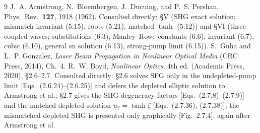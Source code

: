 \documentclass[aps,pra,preprint,amsmath,amssymb,nofootinbib,superscriptaddress]{revtex4-2}
\begin{document}
\begin{thebibliography}{9}
 J.~A. Armstrong, N.~Bloembergen, J.~Ducuing, and
P.~S. Pershan, Phys.\ Rev.\ \textbf{127}, 1918 (1962). Consulted directly:
\S V (SHG exact solution; mismatch invariant (5.15), roots (5.21), matched
$\tanh$ (5.12)) and \S VI (three coupled waves; substitutions (6.3),
Manley--Rowe constants (6.6), invariant (6.7), cubic (6.10), general sn
solution (6.13), strong-pump limit (6.15)).
 S.~Guha and L.~P. Gonzalez, \emph{Laser Beam Propagation
in Nonlinear Optical Media} (CRC Press, 2014), Ch.~4.
 R.~W. Boyd, \emph{Nonlinear Optics}, 4th ed. (Academic
Press, 2020), \S2.6--2.7. Consulted directly: \S2.6 solves SFG only in the
undepleted-pump limit [Eqs.~(2.6.24)--(2.6.25)] and defers the depleted
elliptic solution to Armstrong et al.; \S2.7 gives the SHG degeneracy
factors [Eqs.~(2.7.8)--(2.7.9)] and the matched depleted solution
$u_2=\tanh\zeta$ [Eqs.~(2.7.36), (2.7.38)]; the mismatched depleted SHG is
presented only graphically [Fig.~2.7.4], again after Armstrong et al.
\end{thebibliography}
\end{document}
